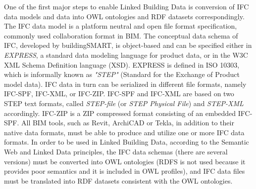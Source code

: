 One of the first major steps to enable Linked Building Data is conversion of IFC data models and data into OWL ontologies and RDF datasets correspondingly.
The IFC data model is a platform neutral and open file format specification, commonly used collaboration format in BIM.
The conceptual data schema of IFC, developed by buildingSMART, is object-based and can be specified either in \emph{EXPRESS}, a standard data modeling language for product data, or in the W3C XML Schema Definition language (XSD).
EXPRESS is defined in ISO 10303, which is informally known as \emph{"STEP"} (Standard for the Exchange of Product model data).
IFC data in turn can be serialized in different file formats, namely IFC-SPF, IFC-XML, or IFC-ZIP.
IFC-SPF and IFC-XML are based on two STEP text formats, called \emph{STEP-file} (or \emph{STEP Physical File}) and \emph{STEP-XML} accordingly. 
IFC-ZIP is a ZIP compressed format consisting of an embedded IFC-SPF.
All BIM tools, such as Revit, ArchiCAD or Tekla, in addition to their native data formats, must be able to produce and utilize one or more IFC data formats.
In order to be used in Linked Building Data, according to the Semantic Web and Linked Data principles, the IFC data schemas (there are several versions) must be converted into OWL ontologies (RDFS is not used because it provides poor semantics and it is included in OWL profiles), and IFC data files must be translated into RDF datasets consistent with the OWL ontologies.




